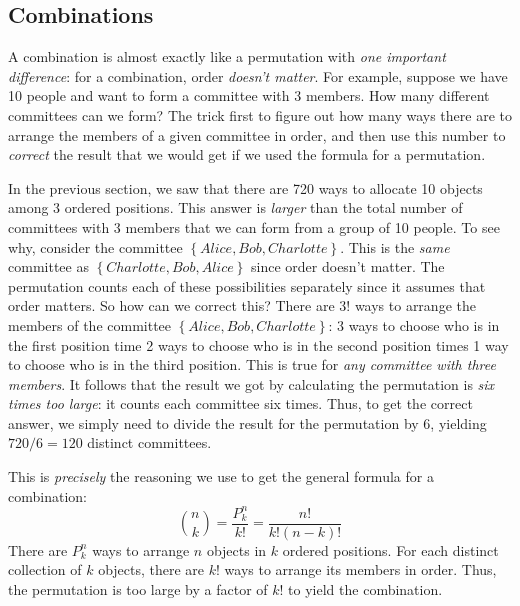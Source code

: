 \documentclass[12pt]{article}
\begin{document}
\subsection*{Combinations}
A combination is almost exactly like a permutation with \emph{one important difference}: for a combination, order \emph{doesn't matter}.
For example, suppose we have 10 people and want to form a committee with 3 members.
How many different committees can we form?
The trick first to figure out how many ways there are to arrange the members of a given committee in order, and then use this number to \emph{correct} the result that we would get if we used the formula for a permutation.

In the previous section, we saw that there are 720 ways to allocate 10 objects among 3 ordered positions.
This answer is \emph{larger} than the total number of committees with 3 members that we can form from a group of 10 people.
To see why, consider the committee $\left\{ Alice, Bob, Charlotte \right\}$.
This is the \emph{same} committee as $\left\{ Charlotte, Bob, Alice \right\}$ since order doesn't matter.
The permutation counts each of these possibilities separately since it assumes that order matters.
So how can we correct this?
There are $3!$ ways to arrange the members of the committee $\left\{ Alice, Bob, Charlotte \right\}$: 3 ways to choose who is in the first position time 2 ways to choose who is in the second position times 1 way to choose who is in the third position.
This is true for \emph{any committee with three members}.
It follows that the result we got by calculating the permutation is \emph{six times too large}: it counts each committee six times.
Thus, to get the correct answer, we simply need to divide the result for the permutation by 6, yielding $720/6=120$ distinct committees.

This is \emph{precisely} the reasoning we use to get the general formula for a combination:
\begin{equation*}
  {n\choose k} = \frac{P^{n}_{k}}{k!} = \frac{n!}{k!\left( n-k \right)!}
\end{equation*}
There are $P^{n}_{k}$ ways to arrange $n$ objects in $k$ ordered positions.
For each distinct collection of $k$ objects, there are $k!$ ways to arrange its members in order.
Thus, the permutation is too large by a factor of $k!$ to yield the combination.
\end{document}
